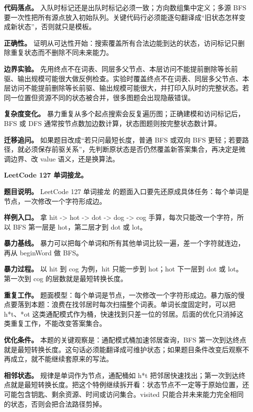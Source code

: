 \textbf{代码落点。} 入队时标记还是出队时标记必须一致；方向数组集中定义；多源 BFS 要一次性把所有源点放入初始队列。关键代码行必须能逐句翻译成“旧状态怎样变成新状态”，否则就只是模板。

\textbf{正确性。} 证明从可达性开始：搜索覆盖所有合法边能到达的状态，访问标记只删除重复状态而不删除不同未来能力。

\textbf{边界实验。} 先用终点不在词表、同层多父节点、本层访问不能提前删除等长前驱、输出规模可能很大做反例检查。实验时覆盖终点不在词表、同层多父节点、本层访问不能提前删除等长前驱、输出规模可能很大，并打印入队时的完整状态。若同一位置但资源不同的状态被合并，很多图题会出现隐蔽错误。

\textbf{复杂度变化。} 暴力重复从多个起点搜索会反复遍历图；正确建模和访问标记后，BFS 或 DFS 通常按节点数加边数计算，状态图题则按完整状态数计算。

\textbf{迁移追问。} 如果题目改成“若只问最短长度，普通 BFS 或双向 BFS 更轻；若要路径，就必须保存前驱关系”，先判断原状态是否仍然覆盖新答案集合，再决定是微调边界、改 value 语义，还是换算法。

\noindent\textbf{LeetCode 127 单词接龙。}

\textbf{题目说明。} LeetCode 127 单词接龙 的题面入口要先还原成具体任务：每个单词是节点，一次修改一个字符形成边。

\textbf{样例入口。} 拿 hit -> hot -> dot -> dog -> cog 手算，每次只能改一个字符，所以 BFS 第一层是 hot，第二层才到 dot 或 lot。

\textbf{暴力基线。} 暴力可以把每个单词和所有其他单词比较一遍，差一个字符就连边，再从 beginWord 做 BFS。

\textbf{暴力过程。} 以 hit 到 cog 为例，hit 只能一步到 hot；hot 下一层到 dot 或 lot。第一次到 cog 的层数就是最短转换长度。

\textbf{重复工作。} 题面模型：每个单词是节点，一次修改一个字符形成边。暴力版的慢点要落到本题：浪费在找邻居时每次扫描整个词表。单词长度固定时，可以把 h*t、*ot 这类通配模式作为桶，快速找到只差一位的邻居。后面的优化只消掉这类重复工作，不能改变答案集合。

\textbf{优化条件。} 本题的关键观察是：通配模式桶加速邻居查询，BFS 第一次到达终点就是最短转换长度。这句话必须能翻译成可维护状态；如果题目条件改变后观察不再成立，就不能继续套原来的写法。

\textbf{相邻状态。} 规律是单词作为节点，通配桶如 h*t 把邻居快速找出；第一次到达终点就是最短转换长度。把这个特例继续拆开看：状态节点不一定等于原始位置，还可能包含钥匙、剩余资源、时间或访问集合。visited 只能合并未来能力完全相同的状态，否则会把合法路径剪掉。

